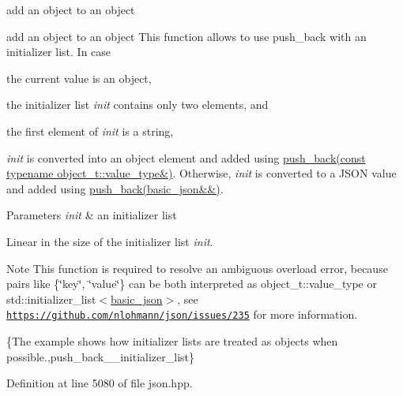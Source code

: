 add an object to an object 

add an object to an object This function allows to use {\ttfamily push\+\_\+back} with an initializer list. In case


\begin{DoxyEnumerate}
\item the current value is an object,
\item the initializer list {\itshape init} contains only two elements, and
\item the first element of {\itshape init} is a string,
\end{DoxyEnumerate}

{\itshape init} is converted into an object element and added using \hyperlink{classnlohmann_1_1basic__json_a5212588544f6d2266384c3be9bfda0c5}{push\+\_\+back(const typename object\+\_\+t\+::value\+\_\+type\&)}. Otherwise, {\itshape init} is converted to a J\+S\+O\+N value and added using \hyperlink{classnlohmann_1_1basic__json_a486b96adbf4886c38e38c952394a220f}{push\+\_\+back(basic\+\_\+json\&\&)}.


\begin{DoxyParams}{Parameters}
{\em init} & an initializer list\\
\hline
\end{DoxyParams}
Linear in the size of the initializer list {\itshape init}.

\begin{DoxyNote}{Note}
This function is required to resolve an ambiguous overload error, because pairs like {\ttfamily \{\char`\"{}key\char`\"{}, \char`\"{}value\char`\"{}\}} can be both interpreted as {\ttfamily object\+\_\+t\+::value\+\_\+type} or {\ttfamily std\+::initializer\+\_\+list$<$\hyperlink{classnlohmann_1_1basic__json}{basic\+\_\+json}$>$}, see \href{https://github.com/nlohmann/json/issues/235}{\tt https\+://github.\+com/nlohmann/json/issues/235} for more information.
\end{DoxyNote}
\{The example shows how initializer lists are treated as objects when possible.,push\+\_\+back\+\_\+\+\_\+initializer\+\_\+list\} 

Definition at line 5080 of file json.\+hpp.

\hypertarget{classnlohmann_1_1basic__json_a0b059e0a80dddc705e93fd145a015058}{}
